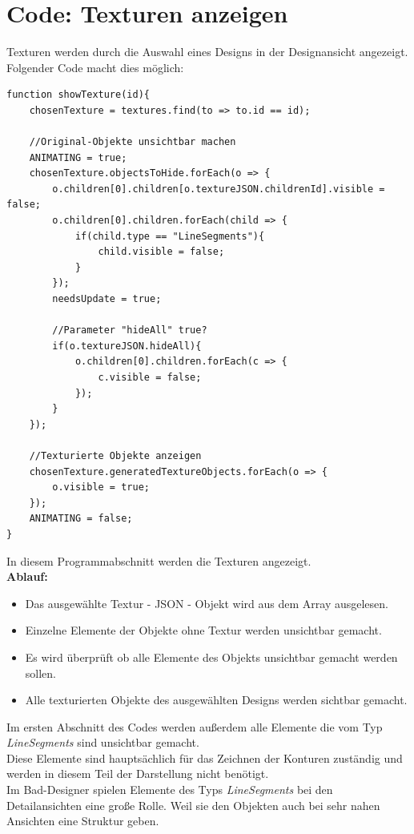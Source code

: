 \section{Code: Texturen anzeigen}
Texturen werden durch die Auswahl eines Designs in der Designansicht angezeigt.\\
Folgender Code macht dies möglich:
\begin{lstlisting}
function showTexture(id){
    chosenTexture = textures.find(to => to.id == id);

    //Original-Objekte unsichtbar machen
    ANIMATING = true;
    chosenTexture.objectsToHide.forEach(o => {
        o.children[0].children[o.textureJSON.childrenId].visible = false;
        o.children[0].children.forEach(child => {
            if(child.type == "LineSegments"){
                child.visible = false;
            }
        });
        needsUpdate = true;
        
        //Parameter "hideAll" true?
        if(o.textureJSON.hideAll){
            o.children[0].children.forEach(c => {
                c.visible = false;
            });
        }
    });

    //Texturierte Objekte anzeigen
    chosenTexture.generatedTextureObjects.forEach(o => {
        o.visible = true;
    });
    ANIMATING = false;
}
\end{lstlisting}
In diesem Programmabschnitt werden die Texturen angezeigt. \\
\textbf{Ablauf:}
\begin{itemize}
    \item Das ausgewählte Textur - JSON - Objekt wird aus dem Array ausgelesen.
    \item Einzelne Elemente der Objekte ohne Textur werden unsichtbar gemacht.
    \item Es wird überprüft ob alle Elemente des Objekts unsichtbar gemacht werden sollen.
    \item Alle texturierten Objekte des ausgewählten Designs werden sichtbar gemacht.
\end{itemize}
Im ersten Abschnitt des Codes werden außerdem alle Elemente die vom Typ \textit{LineSegments} sind unsichtbar gemacht. \\
Diese Elemente sind hauptsächlich für das Zeichnen der Konturen zuständig und werden in diesem Teil der Darstellung nicht benötigt. \\
Im Bad-Designer spielen Elemente des Typs \textit{LineSegments} bei den Detailansichten eine große Rolle. Weil sie den Objekten auch bei sehr nahen Ansichten eine Struktur geben.
\newpage
